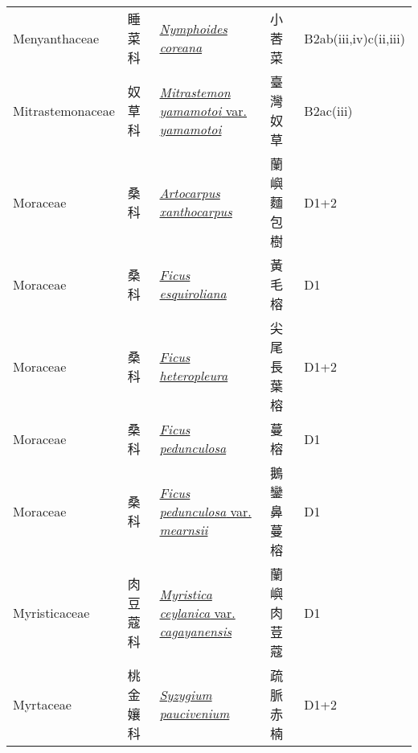{\begin{longtable}{p{2.5cm}p{2.5cm}p{4.5cm}p{2.5cm}p{3cm}}
    Menyanthaceae & 睡菜科 & \href{http://www.theplantlist.org/tpl1.1/search?q=Nymphoides+coreana}{\textit{Nymphoides coreana} } & 小莕菜 & B2ab(iii,iv)c(ii,iii) \index{Nymphoides@\textit{Nymphoides}!coreana@\textit{coreana}}  \index{小莕菜} \\
    Mitrastemonaceae & 奴草科 & \href{http://www.theplantlist.org/tpl1.1/search?q=Mitrastemon+yamamotoi+var.+yamamotoi}{\textit{Mitrastemon yamamotoi} var. \textit{yamamotoi} } & 臺灣奴草 & B2ac(iii) \index{Mitrastemon@\textit{Mitrastemon}!yamamotoi@\textit{yamamotoi}!var. yamamotoi@var. \textit{yamamotoi}}  \index{臺灣奴草} \\
    Moraceae & 桑科 & \href{http://www.theplantlist.org/tpl1.1/search?q=Artocarpus+xanthocarpus}{\textit{Artocarpus xanthocarpus} } & 蘭嶼麵包樹 & D1+2 \index{Artocarpus@\textit{Artocarpus}!xanthocarpus@\textit{xanthocarpus}}  \index{蘭嶼麵包樹} \\
    Moraceae & 桑科 & \href{http://www.theplantlist.org/tpl1.1/search?q=Ficus+esquiroliana}{\textit{Ficus esquiroliana} } & 黃毛榕 & D1 \index{Ficus@\textit{Ficus}!esquiroliana@\textit{esquiroliana}}  \index{黃毛榕} \\
    Moraceae & 桑科 & \href{http://www.theplantlist.org/tpl1.1/search?q=Ficus+heteropleura}{\textit{Ficus heteropleura} } & 尖尾長葉榕 & D1+2 \index{Ficus@\textit{Ficus}!heteropleura@\textit{heteropleura}}  \index{尖尾長葉榕} \\
    Moraceae & 桑科 & \href{http://www.theplantlist.org/tpl1.1/search?q=Ficus+pedunculosa}{\textit{Ficus pedunculosa} } & 蔓榕 & D1 \index{Ficus@\textit{Ficus}!pedunculosa@\textit{pedunculosa}}  \index{蔓榕} \\
    Moraceae & 桑科 & \href{http://www.theplantlist.org/tpl1.1/search?q=Ficus+pedunculosa+var.+mearnsii}{\textit{Ficus pedunculosa} var. \textit{mearnsii} } & 鵝鑾鼻蔓榕 & D1 \index{Ficus@\textit{Ficus}!pedunculosa@\textit{pedunculosa}!var. mearnsii@var. \textit{mearnsii}}  \index{鵝鑾鼻蔓榕} \\
    Myristicaceae & 肉豆蔻科 & \href{http://www.theplantlist.org/tpl1.1/search?q=Myristica+ceylanica+var.+cagayanensis}{\textit{Myristica ceylanica} var. \textit{cagayanensis} } & 蘭嶼肉荳蔻 & D1 \index{Myristica@\textit{Myristica}!ceylanica@\textit{ceylanica}!var. cagayanensis@var. \textit{cagayanensis}}  \index{蘭嶼肉荳蔻} \\
    Myrtaceae & 桃金孃科 & \href{http://www.theplantlist.org/tpl1.1/search?q=Syzygium+paucivenium}{\textit{Syzygium paucivenium} } & 疏脈赤楠 & D1+2 \index{Syzygium@\textit{Syzygium}!paucivenium@\textit{paucivenium}}  \index{疏脈赤楠} \\

\end{longtable}}
